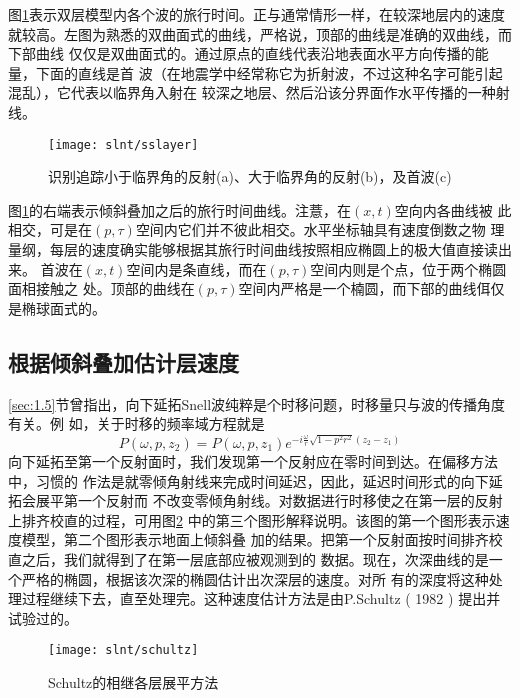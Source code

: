 图\ref{fig:slnt/sslayer}表示双层模型内各个波的旅行时间。正与通常情形一样，在较深地层内的速度
就较高。左图为熟悉的双曲面式的曲线，严格说，顶部的曲线是准确的双曲线，而下部曲线
仅仅是双曲面式的。通过原点的直线代表沿地表面水平方向传播的能量，下面的直线是首
波（在地震学中经常称它为折射波，不过这种名字可能引起混乱），它代表以临界角入射在
较深之地层、然后沿该分界面作水平传播的一种射线。
\begin{figure}[H]
\centering
\texttt{[image: slnt/sslayer]}
\caption[sslayer]{识别追踪小于临界角的反射(a)、大于临界角的反射(b)，及首波(c)}
\label{fig:slnt/sslayer}
\end{figure}

图\ref{fig:slnt/sslayer}的右端表示倾斜叠加之后的旅行时间曲线。注薏，在$(x,t)$空向内各曲线被
此相交，可是在$(p,\tau)$空间内它们并不彼此相交。水平坐标轴具有速度倒数之物
理量纲，每层的速度确实能够根据其旅行时间曲线按照相应椭圆上的极大值直接读出来。
首波在$(x,t)$空间内是条直线，而在$(p,\tau)$空间内则是个点，位于两个椭圆面相接触之
处。顶部的曲线在$(p,\tau)$空间内严格是一个楠圆，而下部的曲线佴仅是椭球面式的。

\subsection{根据倾斜叠加估计层速度}
\label{sec:5.2.4}

\ref{sec:1.5}节曾指出，向下延拓Snell波纯粹是个时移问题，时移量只与波的传播角度有关。例
如，关于时移的频率域方程就是
\begin{equation}
P(\omega,p,z_2)=P(\omega,p,z_1)e^{-i\frac{\omega}{r}\sqrt{1-p^2r^2}(z_2-z_1)}
\label{eq:ex5.2.5}
\end{equation}
向下延拓至第一个反射面时，我们发现第一个反射应在零时间到达。在偏移方法中，习惯的
作法是就零倾角射线来完成时间延迟，因此，延迟时间形式的向下延拓会展平第一个反射而
不改变零倾角射线。对数据进行时移使之在第一层的反射上排齐校直的过程，可用图\ref{fig:slnt/schultz}
中的第三个图形解释说明。该图的第一个图形表示速度模型，第二个图形表示地面上倾斜叠
加的结果。把第一个反射面按时间排齐校直之后，我们就得到了在第一层底部应被观测到的
数据。现在，次深曲线的是一个严格的椭圆，根据该次深的椭圆估计出次深层的速度。对所
有的深度将这种处理过程继续下去，直至处理完。这种速度估计方法是由P.Schultz
( 1982 ) 提出并试验过的。

\begin{figure}[H]
\centering
\texttt{[image: slnt/schultz]}
\caption[schultz]{Schultz的相继各层展平方法}
\label{fig:slnt/schultz}
\end{figure}

